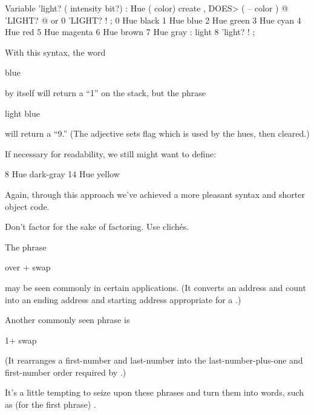 \begin{Code}
Variable 'light?  ( intensity bit?)
: Hue  ( color)  create ,
   DOES>  ( -- color )  @  'LIGHT? @  or  0 'LIGHT? ! ;
 0 Hue black         1 Hue blue           2 Hue green
 3 Hue cyan          4 Hue red            5 Hue magenta
 6 Hue brown         7 Hue gray
: light   8 'light? ! ;
\end{Code}
With this syntax, the word

\begin{Code}
blue
\end{Code}
by itself will return a ``1'' on the stack, but the phrase

\begin{Code}
light blue
\end{Code}
will return a ``9.'' (The adjective  sets flag which is
used by the hues, then cleared.)

\goodbreak
If necessary for readability, we still might want to define:

\begin{Code}
8 Hue dark-gray
14 Hue yellow
\end{Code}
Again, through this approach we've achieved a more pleasant syntax and
shorter object code.

\begin{tip}
Don't factor for the sake of factoring. Use clich\'es.
\end{tip}
The phrase

\begin{Code}
over + swap
\end{Code}
may be seen commonly in certain applications. (It converts an address and
count into an ending address and starting address appropriate for a
.)

Another commonly seen phrase is

\begin{Code}
1+ swap
\end{Code}
(It rearranges a first-number and last-number into the
last-number-plus-one and first-number order required by .)

It's a little tempting to seize upon these phrases and turn them into
words, such as (for the first phrase) .

